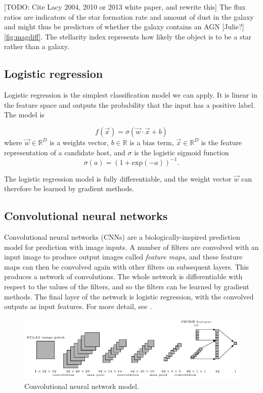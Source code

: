 \documentclass[fleqn,usenatbib,usedcolumn]{mnras}
\begin{document}
    [TODO: Cite Lacy 2004, 2010 or 2013 white paper, and rewrite this] The
    flux ratios are indicators of the star formation rate and amount of dust
    in the galaxy and might thus be predictors of whether the galaxy contains
    an AGN {[}Julie?{]} \ref{fig:magdiff}. The stellarity index represents how
    likely the object is to be a star rather than a galaxy.

  \subsection{Logistic regression}\label{logistic-regression}

    Logistic regression is the simplest classification model we can apply.
    It is linear in the feature space and outputs the probability that the
    input has a positive label. The model is

    \[
        f(\vec x) = \sigma(\vec w \cdot \vec x + b)
    \] where \(\vec w \in \mathbb{R}^D\) is a weights vector,
    \(b \in \mathbb{R}\) is a bias term, \(\vec x \in \mathbb{R}^D\) is the
    feature representation of a candidate host, and \(\sigma\) is the
    logistic sigmoid function \[
        \sigma(a) = (1 + \mathrm{exp}(-a))^{-1}.
    \]

    The logistic regression model is fully differentiable, and the weight vector $\vec w$ can therefore be learned by gradient methods.

  \subsection{Convolutional neural
  networks}\label{convolutional-neural-networks}

    Convolutional neural networks (CNNs) are a biologically-inspired
    prediction model for prediction with image inputs. A number of filters
    are convolved with an input image to produce output images called \emph{feature maps}, and these feature maps can then be convolved again with other filters on subsequent layers. This produces a network of convolutions. The whole network is
    differentiable with respect to the values of the filters, and so the
    filters can be learned by gradient methods. The final layer of the
    network is logistic regression, with the convolved outputs as input
    features. For more detail, see \citet[\S II.A][]{lecun98}.

    \begin{figure}
      \centering
      \includegraphics[width=\textwidth]{convnet.pdf}
      \caption{Convolutional neural network model.}
      \label{fig:cnn}
    \end{figure}
\end{document}
